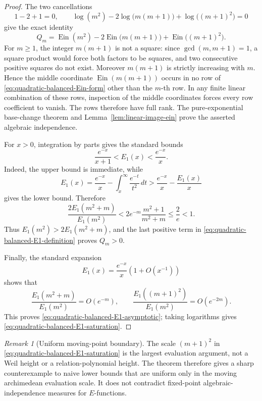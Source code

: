 \documentclass[11pt]{article}
\theoremstyle{definition}
\theoremstyle{remark}
\newtheorem{remark}[theorem]{Remark}
\newcommand{\Ein}{\operatorname{Ein}}
\begin{document}
\begin{proof}
The two cancellations
\[
 1-2+1=0,
 \qquad
 \log(m^2)-2\log\bigl(m(m+1)\bigr)+\log\bigl((m+1)^2\bigr)=0
\]
give the exact identity
\begin{equation}\label{eq:quadratic-balanced-Ein-form}
 Q_m=\Ein(m^2)-2\Ein\bigl(m(m+1)\bigr)
       +\Ein\bigl((m+1)^2\bigr).
\end{equation}
For \(m\geq1\), the integer \(m(m+1)\) is not a square: since
\(\gcd(m,m+1)=1\), a square product would force both factors to be
squares, and two consecutive positive squares do not exist.  Moreover
\(m(m+1)\) is strictly increasing with \(m\).  Hence the middle coordinate
\(\Ein(m(m+1))\) occurs in no row of
\eqref{eq:quadratic-balanced-Ein-form} other than the \(m\)-th row.  In any
finite linear combination of these rows, inspection of the middle
coordinates forces every row coefficient to vanish.  The rows therefore
have full rank.  The pure-exponential base-change theorem and
Lemma~\ref{lem:linear-image-ein} prove the asserted algebraic independence.

For \(x>0\), integration by parts gives the standard bounds
\begin{equation}\label{eq:E1-two-sided-bound}
 \frac{e^{-x}}{x+1}<E_1(x)<\frac{e^{-x}}x.
\end{equation}
Indeed, the upper bound is immediate, while
\[
 E_1(x)=\frac{e^{-x}}x-\int_x^\infty\frac{e^{-t}}{t^2}\,dt
 >\frac{e^{-x}}x-\frac{E_1(x)}x
\]
gives the lower bound.  Therefore
\[
 \frac{2E_1(m^2+m)}{E_1(m^2)}
 <2e^{-m}\frac{m^2+1}{m^2+m}
 \leq\frac2e<1.
\]
Thus \(E_1(m^2)>2E_1(m^2+m)\), and the last positive term in
\eqref{eq:quadratic-balanced-E1-definition} proves \(Q_m>0\).

Finally, the standard expansion
\[
 E_1(x)=\frac{e^{-x}}x\left(1+O(x^{-1})\right)
\]
shows that
\[
 \frac{E_1(m^2+m)}{E_1(m^2)}=O(e^{-m}),
 \qquad
 \frac{E_1((m+1)^2)}{E_1(m^2)}=O(e^{-2m}).
\]
This proves \eqref{eq:quadratic-balanced-E1-asymptotic}; taking logarithms
gives \eqref{eq:quadratic-balanced-E1-saturation}.
\end{proof}

\begin{remark}[Uniform moving-point boundary]
The scale \((m+1)^2\) in
\eqref{eq:quadratic-balanced-E1-saturation} is the largest evaluation
argument, not a Weil height or a relation-polynomial height.  The theorem
therefore gives a sharp counterexample to naive lower bounds that are
uniform only in the moving archimedean evaluation scale.  It does not
contradict fixed-point algebraic-independence measures for \(E\)-functions.
\end{remark}
\end{document}
